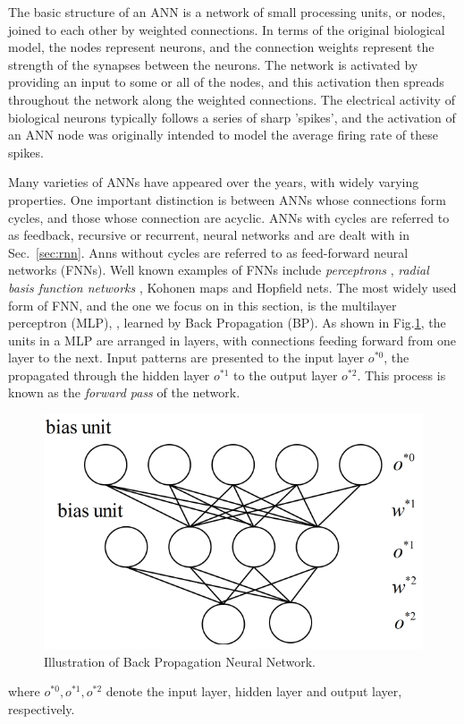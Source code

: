 \documentclass[runningheads,openany]{xhlPaper}
\begin{document}
The basic structure of an ANN is a network of small processing units, or nodes, joined to each other by weighted connections.
In terms of the original biological model, the nodes represent neurons, and the connection weights represent the strength of the synapses between the neurons.
The network is activated by providing an input to some or all of the nodes, and this activation then spreads throughout the network along the weighted connections.
The electrical activity of biological neurons typically follows a series of sharp 'spikes', and the activation of an ANN node was originally intended to model the average firing rate of these spikes.

Many varieties of ANNs have appeared over the years, with widely varying properties.
One important distinction is between ANNs whose connections form cycles, and those whose connection are acyclic.
ANNs with cycles are referred to as feedback, recursive or recurrent, neural networks and are dealt with in Sec.~\ref{sec:rnn}.
Anns without cycles are referred to as feed-forward neural networks (FNNs). Well known examples of FNNs include \emph{perceptrons} \cite{Rosenblatt_Perceptron_1958}, \emph{radial basis function networks} \cite{Broomhead_Radial_NN_1988}, Kohonen maps and Hopfield nets.
The most widely used form of FNN, and the one we focus on in this section, is the multilayer perceptron (MLP), \cite{Rumelhart_BP_1986, Werbos_BP_1990}, learned by Back Propagation (BP).
As shown in Fig.\ref{fig:bpNeuralNetwork}, the units in a MLP are arranged in layers, with connections feeding forward from one layer to the next.
Input patterns are presented to the input layer $o^{*0}$, the propagated through the hidden layer $o^{*1}$ to the output layer $o^{*2}$. This process is known as the \emph{forward pass} of the network.

\begin{figure}
\centering
\includegraphics[width=0.5\linewidth]{bpNeuralNetwork}
\caption{Illustration of Back Propagation Neural Network.}
\label{fig:bpNeuralNetwork}
\end{figure}
where $o^{*0}, o^{*1}, o^{*2}$ denote the input layer, hidden layer and output layer, respectively.
\end{document}
